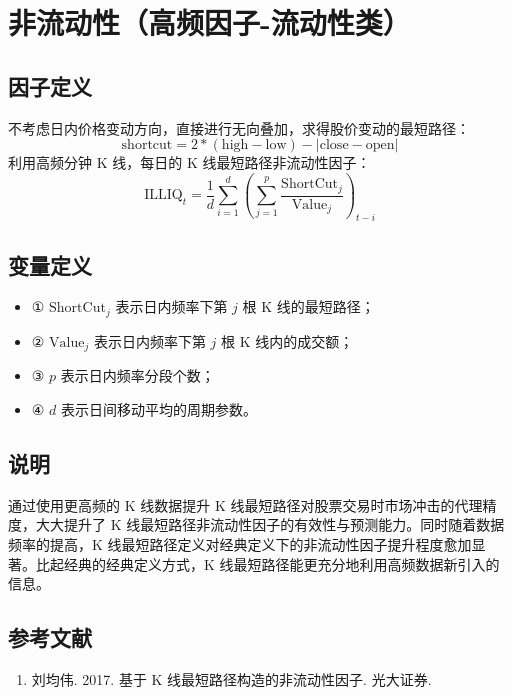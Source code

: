 \documentclass{article}
\begin{document}
\section{非流动性（高频因子-流动性类）}

\subsection{因子定义}

不考虑日内价格变动方向，直接进行无向叠加，求得股价变动的最短路径：
\begin{equation}
    \mathrm{shortcut} = 2 * (\mathrm{high} - \mathrm{low}) - |\mathrm{close} - \mathrm{open}|
\end{equation}
利用高频分钟 K 线，每日的 K 线最短路径非流动性因子：
\begin{equation}
    \mathrm{ILLIQ}_t = \frac{1}{d} \sum_{i=1}^d \left( \sum_{j=1}^p \frac{\mathrm{ShortCut}_j}{\mathrm{Value}_j} \right)_{t-i}
\end{equation}

\subsection{变量定义}
\begin{itemize}
    \item ① \(\mathrm{ShortCut}_j\) 表示日内频率下第 \(j\) 根 K 线的最短路径；
    \item ② \(\mathrm{Value}_j\) 表示日内频率下第 \(j\) 根 K 线内的成交额；
    \item ③ \(p\) 表示日内频率分段个数；
    \item ④ \(d\) 表示日间移动平均的周期参数。
\end{itemize}

\subsection{说明}
通过使用更高频的 K 线数据提升 K 线最短路径对股票交易时市场冲击的代理精度，大大提升了 K 线最短路径非流动性因子的有效性与预测能力。同时随着数据频率的提高，K 线最短路径定义对经典定义下的非流动性因子提升程度愈加显著。比起经典的经典定义方式，K 线最短路径能更充分地利用高频数据新引入的信息。

\subsection{参考文献}
\begin{enumerate}
    \item 刘均伟. 2017. 基于 K 线最短路径构造的非流动性因子. 光大证券.
\end{enumerate}
\end{document}

